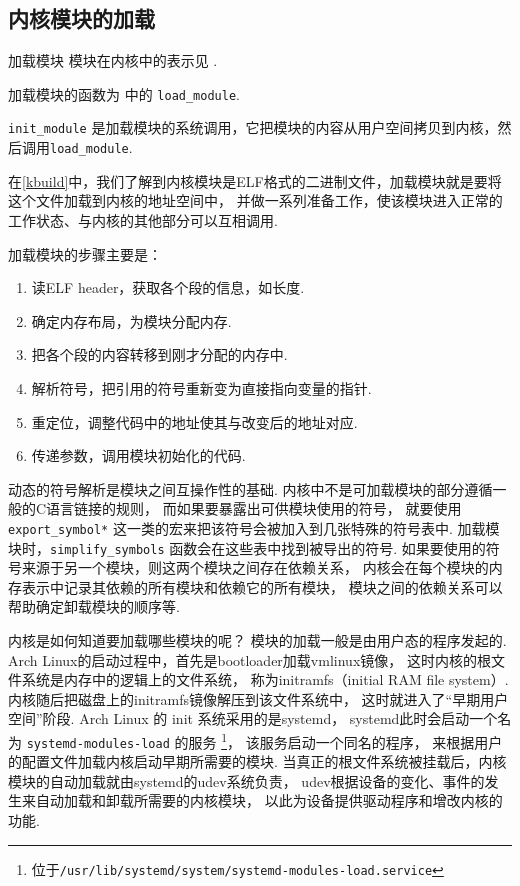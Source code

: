 \subsection{内核模块的加载} \label{loading modules}

\begin{readsrcbox}{加载模块}
	模块在内核中的表示见 .

	加载模块的函数为  中的 \lstinline{load_module}.

	\lstinline{init_module} 是加载模块的系统调用，它把模块的内容从用户空间拷贝到内核，然后调用\lstinline{load_module}.
\end{readsrcbox}

在\ref{kbuild}中，我们了解到内核模块是ELF格式的二进制文件，加载模块就是要将这个文件加载到内核的地址空间中，
并做一系列准备工作，使该模块进入正常的工作状态、与内核的其他部分可以互相调用.

加载模块的步骤主要是：
\begin{enumerate}
	\item 读ELF header，获取各个段的信息，如长度.
	\item 确定内存布局，为模块分配内存.
	\item 把各个段的内容转移到刚才分配的内存中.
	\item 解析符号，把引用的符号重新变为直接指向变量的指针.
	\item 重定位，调整代码中的地址使其与改变后的地址对应.
	\item 传递参数，调用模块初始化的代码.
\end{enumerate}

动态的符号解析是模块之间互操作性的基础.
内核中不是可加载模块的部分遵循一般的C语言链接的规则，
而如果要暴露出可供模块使用的符号，
就要使用 \lstinline{export_symbol*} 这一类的宏来把该符号会被加入到几张特殊的符号表中. \cite{Unreliab5:online}
加载模块时，\lstinline{simplify_symbols} 函数会在这些表中找到被导出的符号.
如果要使用的符号来源于另一个模块，则这两个模块之间存在依赖关系，
内核会在每个模块的内存表示中记录其依赖的所有模块和依赖它的所有模块，
模块之间的依赖关系可以帮助确定卸载模块的顺序等.

内核是如何知道要加载哪些模块的呢？
模块的加载一般是由用户态的程序发起的.
Arch Linux的启动过程\cite{archboot:online}中，首先是bootloader加载vmlinux镜像，
这时内核的根文件系统是内存中的逻辑上的文件系统，
称为initramfs（initial RAM file system）.
内核随后把磁盘上的initramfs镜像解压到该文件系统中，
这时就进入了“早期用户空间”阶段.
Arch Linux 的 init 系统采用的是systemd，
systemd此时会启动一个名为 \lstinline{systemd-modules-load} 的服务
\footnote{位于\lstinline{/usr/lib/systemd/system/systemd-modules-load.service}}，
该服务启动一个同名的程序，
来根据用户的配置文件加载内核启动早期所需要的模块.
当真正的根文件系统被挂载后，内核模块的自动加载就由systemd的udev系统负责，
udev根据设备的变化、事件的发生来自动加载和卸载所需要的内核模块，
以此为设备提供驱动程序和增改内核的功能.

